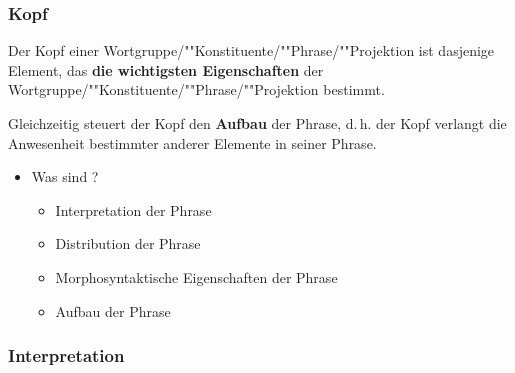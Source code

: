 \begin{frame}
\frametitle{Kopf}

\begin{block}{}
Der Kopf einer Wortgruppe/""Konstituente/""Phrase/""Projektion ist dasjenige Element, das \textbf{die wichtigsten Eigenschaften} der Wortgruppe/""Konstituente/""Phrase/""Projektion bestimmt. 

Gleichzeitig steuert der Kopf den \textbf{Aufbau} der Phrase, d.\,h. der Kopf verlangt die Anwesenheit bestimmter anderer Elemente in seiner Phrase.

\citep[vgl.][]{Adger04a, MuellerS13f, MyP18b}
\end{block}

\pause

\begin{itemize}
	\item Was sind ?
		\begin{itemize}
			\item Interpretation der Phrase
			\item Distribution der Phrase
			\item Morphosyntaktische Eigenschaften der Phrase
			\item Aufbau der Phrase	
		\end{itemize}
\end{itemize}

\end{frame}

\subsubsection{Interpretation}


